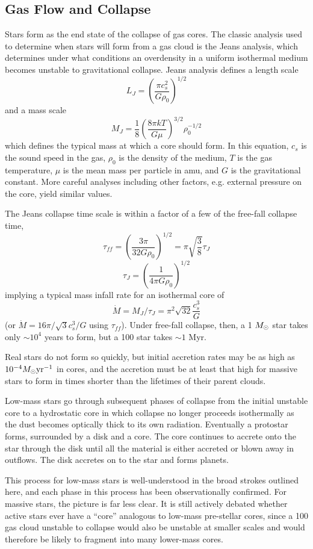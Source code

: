\subsection{Gas Flow and Collapse}
Stars form as the end state of the collapse of gas cores.  The classic analysis
used to determine when stars will form from a gas cloud is the Jeans analysis, which
determines under what conditions an overdensity in a uniform isothermal medium
becomes unstable to gravitational collapse.  Jeans analysis defines a length scale
$$L_J = \left( \frac{\pi c_s^2}{G \rho_0} \right)^{1/2}$$
and a mass scale
$$M_J = \frac{1}{8}\left(\frac{8 \pi k T}{G \mu}\right)^{3/2} \rho_0^{-1/2}$$
which defines the typical mass at which a core should form.  In this equation,
$c_s$ is the sound speed in the gas, $\rho_0$ is the density of the medium, $T$
is the gas temperature, $\mu$ is the mean mass per particle in amu, and $G$ is
the gravitational constant.  More careful analyses including other factors,
e.g. external pressure on the core, yield similar values.

The Jeans collapse time scale is within a factor of a few of the free-fall
collapse time,
$$\tau_{ff} = \left(\frac{3\pi}{32 G \rho_0}\right)^{1/2} =  \pi\sqrt{\frac{3}{8}} \tau_J$$
$$\tau_J = \left(\frac{1}{4 \pi G \rho_0}\right)^{1/2}$$
implying a typical mass infall rate for an isothermal core of
$$\dot{M} = M_J/\tau_J =  \pi^2 \sqrt{32} \frac{c_s^3}{G}$$
(or $\dot{M} = 16 \pi / \sqrt{3} c_s^3 / G$ using $\tau_{ff}$).
Under free-fall collapse, then, a 1 $M_{\odot}$ star takes only $\sim10^4$ years to form,
but a 100 \msun star takes $\sim1$ Myr.

Real stars do not form so quickly, but initial accretion rates may be as high
as $10^{-4} M_{\odot} \textrm{yr}^{-1}$ in cores, and the accretion must be at least that
high for massive stars to form in times shorter than the lifetimes of their
parent clouds.  

Low-mass stars go through subsequent phases of collapse from the initial
unstable core to a hydrostatic core in which collapse no longer proceeds
isothermally as the dust becomes optically thick to its own radiation.
Eventually a protostar forms, surrounded by a disk and a core.  The core
continues to accrete onto the star through the disk until all the material is
either accreted or blown away in outflows.  The disk accretes on to the star
and forms planets.

This process for low-mass stars is well-understood in the broad strokes
outlined here, and each phase in this process has been observationally
confirmed.  For massive stars, the picture is far less clear.  It is still
actively debated whether active stars ever have a ``core'' analogous to 
low-mass pre-stellar cores, since a 100 \msun gas cloud unstable to collapse
would also be unstable at smaller scales and would therefore be likely to fragment
into many lower-mass cores.

